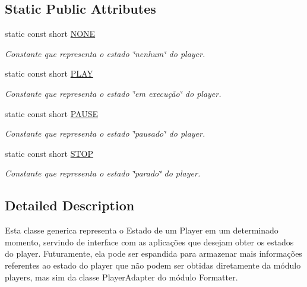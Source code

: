 \subsection*{Static Public Attributes}
\begin{DoxyCompactItemize}
\item 
static const short \hyperlink{classbr_1_1ufscar_1_1lince_1_1ginga_1_1wac_1_1state_1_1IElementaryState_a6b21cf3f8015ef6cbb839a2fc37e5a85}{NONE}
\begin{DoxyCompactList}\small\item\em Constante que representa o estado \char`\"{}nenhum\char`\"{} do player. \item\end{DoxyCompactList}\item 
static const short \hyperlink{classbr_1_1ufscar_1_1lince_1_1ginga_1_1wac_1_1state_1_1IElementaryState_a2d598e7badbbbb5460ed5e8204bb878f}{PLAY}
\begin{DoxyCompactList}\small\item\em Constante que representa o estado \char`\"{}em execução\char`\"{} do player. \item\end{DoxyCompactList}\item 
static const short \hyperlink{classbr_1_1ufscar_1_1lince_1_1ginga_1_1wac_1_1state_1_1IElementaryState_a66848654431dc226cdd3349f0aa845f1}{PAUSE}
\begin{DoxyCompactList}\small\item\em Constante que representa o estado \char`\"{}pausado\char`\"{} do player. \item\end{DoxyCompactList}\item 
static const short \hyperlink{classbr_1_1ufscar_1_1lince_1_1ginga_1_1wac_1_1state_1_1IElementaryState_af53fab5b92d73acc4fb6541d2906d6ce}{STOP}
\begin{DoxyCompactList}\small\item\em Constante que representa o estado \char`\"{}parado\char`\"{} do player. \item\end{DoxyCompactList}\end{DoxyCompactItemize}


\subsection{Detailed Description}
Esta classe generica representa o Estado de um Player em um determinado momento, servindo de interface com as aplicações que desejam obter os estados do player. Futuramente, ela pode ser espandida para armazenar mais informações referentes ao estado do player que não podem ser obtidas diretamente da módulo players, mas sim da classe PlayerAdapter do módulo Formatter. 

